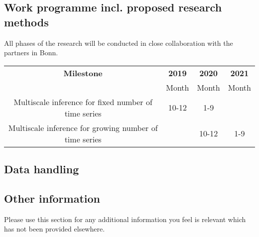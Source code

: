 \documentclass[a4paper,12pt]{article}
\begin{document}



\subsection{Work programme incl. proposed research methods}
All phases of the research will be conducted in close collaboration with the partners in Bonn.
\begin{center}
\begin{tabular}{ c c c c}
{\bf Milestone} & {\bf 2019 }&{\bf 2020}&{\bf 2021}\\
&Month& Month& Month\\
Multiscale inference for fixed number of time series &10-12& 1-9&\\
Multiscale inference for growing number of time series &&10-12 &1-9
\end{tabular}
\end{center}

\subsection{Data handling}

\subsection{Other information}
Please use this section for any additional information you feel is relevant which has not been provided elsewhere.
\end{document}
